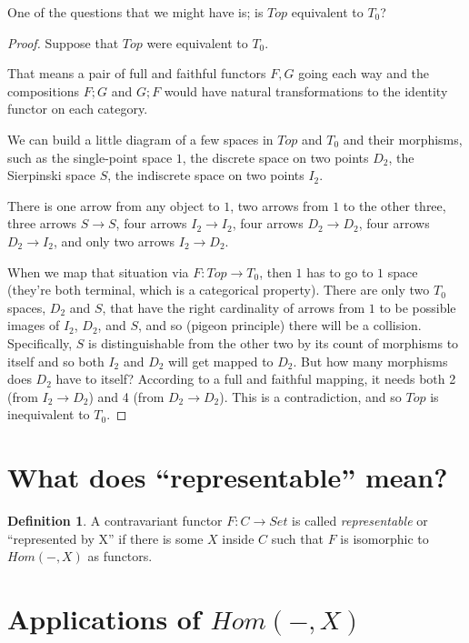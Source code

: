 \documentclass{proc-l}
\theoremstyle{definition}
\newtheorem{definition}[theorem]{Definition}
\theoremstyle{remark}
\numberwithin{equation}{section}
\begin{document}
One of the questions that we might have is; is $Top$ equivalent to $T_0$? 

\begin{proof}
Suppose that $Top$ were equivalent to $T_0$.

That means a pair of full and faithful functors $F, G$ going each way and the compositions $F;G$ and $G;F$ would have natural transformations to the identity functor on each category.

We can build a little diagram of a few spaces in $Top$ and $T_0$ and their morphisms, such as the single-point space $1$, the discrete space on two points $D_2$, the Sierpinski space $S$, the indiscrete space on two points $I_2$.

There is one arrow from any object to $1$, two arrows from $1$ to the other three, three arrows $S \rightarrow S$, four arrows $I_2 \rightarrow I_2$, four arrows $D_2 \rightarrow D_2$, four arrows $D_2 \rightarrow I_2$, and only two arrows $I_2 \rightarrow D_2$.

When we map that situation via $F : Top \rightarrow T_0$, then $1$ has to go to $1$ space (they're both terminal, which is a categorical property). There are only two $T_0$ spaces, $D_2$ and $S$, that have the right cardinality of arrows from $1$ to be possible images of $I_2$, $D_2$, and $S$, and so (pigeon principle) there will be a collision. Specifically, $S$ is distinguishable from the other two by its count of morphisms to itself and so both $I_2$ and $D_2$ will get mapped to $D_2$. But how many morphisms does $D_2$ have to itself? According to a full and faithful mapping, it needs both 2 (from $I_2 \rightarrow D_2$) and 4 (from $D_2 \rightarrow D_2$). This is a contradiction, and so $Top$ is inequivalent to $T_0$.
\end{proof}


\section{What does ``representable'' mean?}

\begin{definition}
\label{representabledefn}
A contravariant functor $F: C \rightarrow Set$ is called \emph{representable} or ``represented by X'' if there is some $X$ inside $C$ such that $F$ is isomorphic to $Hom(-,X)$ as functors.
\end{definition}


\section{Applications of $Hom(-, X)$}
\end{document}
